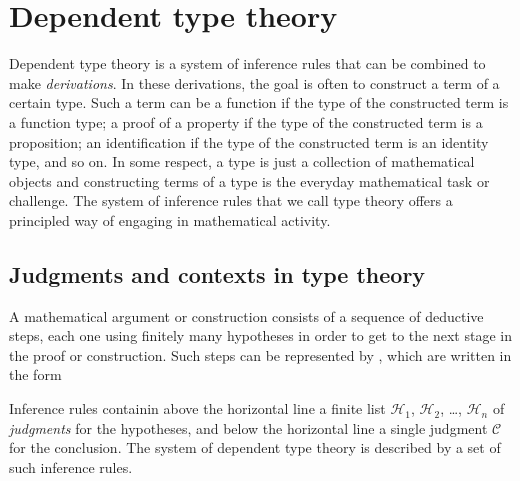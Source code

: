 \section{Dependent type theory}
\label{ch:dtt}

Dependent type theory is a system of inference rules that can be combined to make \emph{derivations}. In these derivations, the goal is often to construct a term of a certain type. Such a term can be a function if the type of the constructed term is a function type; a proof of a property if the type of the constructed term is a proposition; an identification if the type of the constructed term is an identity type, and so on. In some respect, a type is just a collection of mathematical objects and constructing terms of a type is the everyday mathematical task or challenge. The system of inference rules that we call type theory offers a principled way of engaging in mathematical activity.

\subsection{Judgments and contexts in type theory}\label{sec:judgments}
A mathematical argument or construction consists of a sequence of deductive steps, each one using finitely many hypotheses in order to get to the next stage in the proof or construction. Such steps can be represented by , which are written in the form
\begin{prooftree}
\end{prooftree}
Inference rules containin above the horizontal line a finite list $\mathcal{H}_1$, $\mathcal{H}_2$, \dots, $\mathcal{H}_n$ of \emph{judgments} for the hypotheses, and below the horizontal line a single judgment $\mathcal{C}$ for the conclusion. The system of dependent type theory is described by a set of such inference rules.

